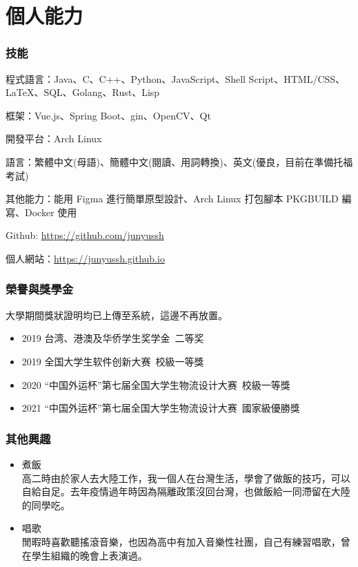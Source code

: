 \documentclass[classical]{einfart}
\providecommand{\tightlist}{%
  \setlength{\itemsep}{0pt}\setlength{\parskip}{0pt}}
\begin{document}
\setcounter{tocdepth}{2}
{\tableofcontents}

\newpage

\part{個人能力}

\section{技能}

程式語言：Java、C、C++、Python、JavaScript、Shell
Script、HTML/CSS、LaTeX、SQL、Golang、Rust、Lisp

框架：Vue.js、Spring Boot、gin、OpenCV、Qt

開發平台：Arch Linux

語言：繁體中文(母語)、簡體中文(閱讀、用詞轉換)、英文(優良，目前在準備托福考試)

其他能力：能用 Figma 進行簡單原型設計、Arch Linux 打包腳本 PKGBUILD
編寫、Docker 使用 

Github: \url{https://github.com/junyussh}

個人網站：\url{https://junyussh.github.io}

\section{榮譽與獎學金}

大學期間獎狀證明均已上傳至系統，這邊不再放置。

\begin{itemize}
\tightlist
\item
  2019 台湾、港澳及华侨学生奖学金\ 二等奖
\item
  2019 全国大学生软件创新大赛\ 校級一等獎
\item
  2020 ``中国外运杯''第七届全国大学生物流设计大赛\ 校級一等獎
\item
  2021 ``中国外运杯''第七届全国大学生物流设计大赛\ 國家級優勝獎
\end{itemize}

\section{其他興趣}

\begin{itemize}
\item
  煮飯\\
  高二時由於家人去大陸工作，我一個人在台灣生活，學會了做飯的技巧，可以自給自足。去年疫情過年時因為隔離政策沒回台灣，也做飯給一同滯留在大陸的同學吃。
\item
  唱歌\\
  閒暇時喜歡聽搖滾音樂，也因為高中有加入音樂性社團，自己有練習唱歌，曾在學生組織的晚會上表演過。
\end{itemize}
\end{document}
